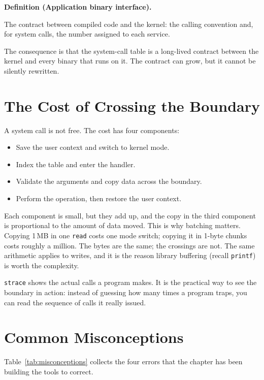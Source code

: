 \documentclass[11pt]{article}
\newenvironment{definitionbox}[1]{%
  \par\noindent\textbf{Definition (#1).}\ \itshape
}{\par\vspace{0.3em}}
\begin{document}
\begin{definitionbox}{Application binary interface}
The contract between compiled code and the kernel: the calling convention and,
for system calls, the number assigned to each service.
\end{definitionbox}

The consequence is that the system-call table is a long-lived contract between
the kernel and every binary that runs on it. The contract can grow, but it
cannot be silently rewritten.

\section{The Cost of Crossing the Boundary}

A system call is not free. The cost has four components:

\begin{itemize}
  \item Save the user context and switch to kernel mode.
  \item Index the table and enter the handler.
  \item Validate the arguments and copy data across the boundary.
  \item Perform the operation, then restore the user context.
\end{itemize}

Each component is small, but they add up, and the copy in the third component
is proportional to the amount of data moved. This is why batching matters.
Copying 1\,MB in one \texttt{read} costs one mode switch; copying it in 1-byte
chunks costs roughly a million. The bytes are the same; the crossings are not.
The same arithmetic applies to writes, and it is the reason library buffering
(recall \texttt{printf}) is worth the complexity.

\texttt{strace} shows the actual calls a program makes. It is the practical way
to see the boundary in action: instead of guessing how many times a program
traps, you can read the sequence of calls it really issued.

\section{Common Misconceptions}

Table~\ref{tab:misconceptions} collects the four errors that the chapter has
been building the tools to correct.
\end{document}
